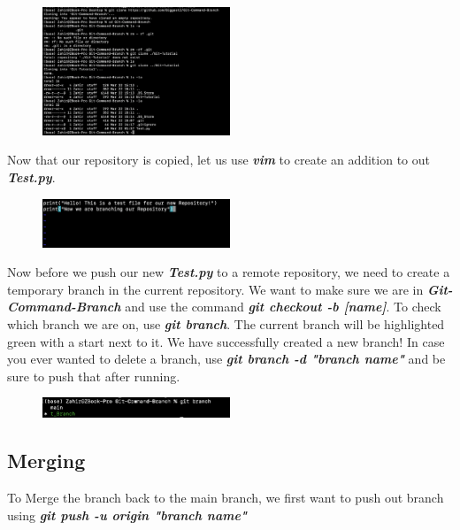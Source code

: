 \documentclass{article}
\begin{document}
\begin{figure}[h]
    \centering
    \includegraphics[width=0.5\textwidth]{Clone.png}
\end{figure}

Now that our repository is copied, let us use \textit{\textbf{vim}} to create an addition to out \textit{\textbf{Test.py}}.

\begin{figure}[h]
    \centering
    \includegraphics[width=0.5\textwidth]{branch1.png}
\end{figure}

\vspace{170pt}

Now before we push our new 
\textit{\textbf{Test.py}} to a remote 
repository, we need to create a temporary 
branch in the current repository. We want to 
make sure we are in \textit{\textbf{Git-
Command-Branch}} and use the command \textit{\textbf{git checkout -b [name]}}. 
To check which branch we are on, use 
\textit{\textbf{git branch}}. The current 
branch will be highlighted green with a start 
next to it. We have successfully created a new 
branch! In case you ever wanted to delete a 
branch, use 
\textit{\textbf{git branch -d "branch name"}} 
and be sure to push that after running.

\begin{figure}[h]
    \centering
    \includegraphics[width=0.5\textwidth]{bCheck.png}
\end{figure}

\subsection*{Merging}
To Merge the branch back to the main branch, we first want to push out branch using \textit{\textbf{git push -u origin "branch name"}}
\end{document}
